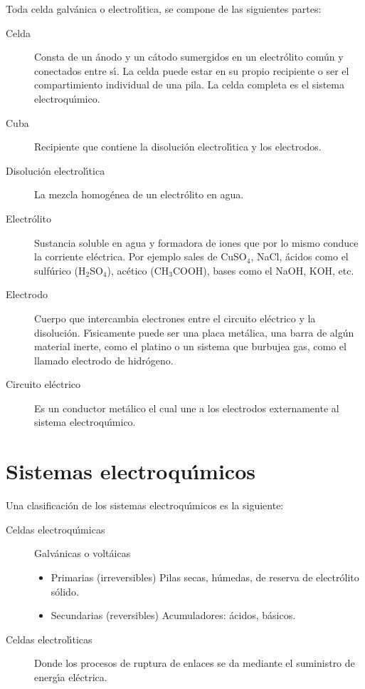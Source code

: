 Toda celda galv\'anica o electrol\'{\i}tica, se compone de las siguientes par\-tes:

\begin{description}
\item [Celda] Consta de un \'anodo y un c\'atodo 
sumergidos en un electr\'olito com\'un y conectados entre
s\'{\i}.  La celda puede estar en su propio recipiente o ser el compartimiento individual de
una pila. La celda completa es el sistema electroqu\'{\i}mico.

\item[Cuba]  Recipiente que contiene la disoluci\'on
electrol\'{\i}tica y los electrodos.
\item [Disoluci\'on electrol\'{\i}tica] La mezcla homog\'enea de un
electr\'olito en agua.
\item[Electr\'olito]  Sustancia soluble en agua y formadora de iones
que por lo mismo conduce la corriente el\'ectrica. Por ejemplo
sales de CuSO$_4$, NaCl, \'acidos como el sulf\'urico 
(H$_2$SO$_4$), ac\'etico (CH$_3$COOH), bases como el NaOH, KOH, etc.
\item[Electrodo] Cuerpo que intercambia electrones entre el
circuito el\'ectrico y la disoluci\'on. F\'{\i}sicamente puede ser
una placa met\'alica, una barra de alg\'un material inerte, como
el platino o un sistema que burbujea gas, como el llamado electrodo
 de hidr\'ogeno.
\item[Circuito el\'ectrico] Es un conductor met\'alico el cual une a los electrodos externamente al sistema electroqu\'{\i}mico.
\end{description}

\section{Sistemas electroqu\'{\i}micos}
Una clasificaci\'on de los sistemas electroqu\'{\i}micos es la siguiente:
\begin{description}
\item[Celdas electroqu\'{\i}micas]
Galv\'anicas o volt\'aicas
\begin{itemize}
 \item Primarias (irreversibles) 
  Pilas secas, h\'umedas, de reserva de e\-lec\-tr\'olito s\'olido.
\item Secundarias (reversibles)
  Acumuladores: \'acidos,
b\'asicos.
\end{itemize}

\item[Celdas electrol\'{\i}ticas] Donde los procesos de ruptura de enlaces se da mediante
el suministro de energ\'{\i}a el\'ectrica.
\end{description}


